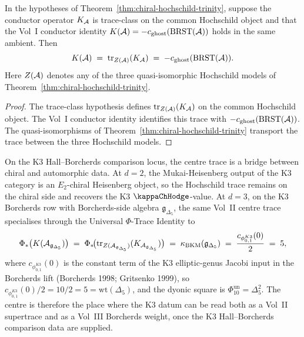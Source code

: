 \begin{theorem}
\label{cor:kappa-conductor-trinity-centre}
In the hypotheses of Theorem~\ref{thm:chiral-hochschild-trinity},
suppose the conductor operator $K_{\mathcal{A}}$ is trace-class on the common
Hochschild object and that the Vol~I conductor identity
$K(\mathcal{A})=-c_{\mathrm{ghost}}(\mathrm{BRST}(\mathcal{A}))$ holds in the same
ambient. Then
\[
 K(\mathcal{A}) \;=\; \mathrm{tr}_{Z(\mathcal{A})}(K_{\mathcal{A}})
 \;=\; -c_{\mathrm{ghost}}(\mathrm{BRST}(\mathcal{A})).
\]
Here $Z(\mathcal{A})$ denotes any of the three quasi-isomorphic Hochschild
models of Theorem~\ref{thm:chiral-hochschild-trinity}.
\end{theorem}

\begin{proof}
The trace-class hypothesis defines $\mathrm{tr}_{Z(\mathcal{A})}(K_{\mathcal{A}})$ on
the common Hochschild object. The Vol~I conductor identity identifies
this trace with $-c_{\mathrm{ghost}}(\mathrm{BRST}(\mathcal{A}))$. The
quasi-isomorphisms of Theorem~\ref{thm:chiral-hochschild-trinity}
transport the trace between the three Hochschild models.
\end{proof}

\begin{example}
\label{ex:trinity-k3-centre-trace}
On the K3 Hall--Borcherds comparison locus, the centre trace is a
bridge between chiral and automorphic data. At $d=2$, the
Mukai-Heisenberg output of the K3 category is an $E_2$-chiral
Heisenberg object, so the Hochschild trace remains on the chiral side
and recovers the K3
$\kappaChHodge$-value. At $d=3$, on the K3 Borcherds row with
Borcherds-side algebra $\mathfrak g_{\Delta_5}$, the same Vol~II
centre trace specialises through the Universal $\Phi$-Trace Identity to
\[
 \Phi_\ast\bigl(K(\mathcal{A}_{\mathfrak g_{\Delta_5}})\bigr)
 \;=\;
 \Phi_\ast\!\bigl(
 \mathrm{tr}_{Z(\mathcal{A}_{\mathfrak g_{\Delta_5}})}
 (K_{\mathcal{A}_{\mathfrak g_{\Delta_5}}})\bigr)
 \;=\;
 \kappa_{\mathrm{BKM}}(\mathfrak g_{\Delta_5})
 \;=\;
 \frac{c_{\phi_{0,1}^{K3}}(0)}{2}
 \;=\;
 5,
\]
where $c_{\phi_{0,1}^{K3}}(0)$ is the constant term of the K3
elliptic-genus Jacobi input in the Borcherds lift
\textup{(}Borcherds 1998; Gritsenko 1999\textup{)}, so
$c_{\phi_{0,1}^{K3}}(0)/2=10/2=5=\mathrm{wt}(\Delta_5)$, and the
dyonic square is $\Phi_{10}^{\mathrm{un}}=\Delta_5^2$. The centre is
therefore the place where the K3 datum can be read both as a Vol~II
supertrace and as a Vol~III Borcherds weight, once the K3
Hall--Borcherds comparison data are supplied.
\end{example}

